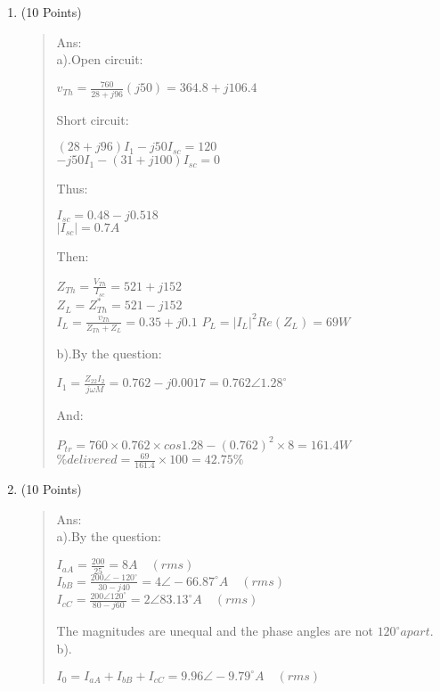 \documentclass[12pt,a4paper]{article}
\begin{document}
\begin{enumerate}
		\clearpage
		\item (10 Points)
		\begin{quote}
			Ans:\\
			a).Open circuit:
			\begin{center}
				$v_{Th}=\frac{760}{28+j96}(j50)=364.8+j106.4$
			\end{center}
			Short circuit:
			\begin{center}
				$(28+j96)I_1-j50I_{sc}=120$\\
				$-j50I_1-(31+j100)I_{sc}=0$
			\end{center}
			Thus:
			\begin{center}
				$I_{sc}=0.48-j0.518$\\
				$|I_{sc}|=0.7A$
			\end{center}
			Then:
			\begin{center}
				$Z_{Th}=\frac{V_{Th}}{I_{sc}}=521+j152$\\
				$Z_L=Z_{Th}^*=521-j152$\\
				$I_L=\frac{v_{Th}}{Z_{Th}+Z_L}=0.35+j0.1$
				$P_L=|I_L|^2Re(Z_L)=69W$
			\end{center}
			b).By the question:
			\begin{center}
				$I_1=\frac{Z_{22}I_2}{j\omega M}=0.762-j0.0017=0.762\angle 1.28^\circ$
			\end{center}
		And:
		\begin{center}
			$P_{tr}=760\times 0.762\times cos1.28 -(0.762)^2\times 8=161.4W$\\
			$\% delivered=\frac{69}{161.4}\times 100= 42.75\%$
		\end{center}
		\end{quote}
	
		\clearpage
		\item (10 Points)
		\begin{quote}
			Ans:\\
			a).By the question:
			\begin{center}
				$I_{aA}=\frac{200}{25}=8A\quad (rms)$\\
				$I_{bB}=\frac{200\angle-120^\circ}{30-j40}=4\angle -66.87^\circ A\quad (rms)$\\
				$I_{cC}=\frac{200\angle120^\circ}{80-j60}=2\angle 83.13^\circ A\quad (rms)$
			\end{center}
			The magnitudes are unequal and the phase angles are not $120^\circ apart.$\\
			b).\begin{center}
				$I_0=I_{aA}+I_{bB}+I_{cC}=9.96\angle-9.79^\circ A\quad (rms)$
			\end{center}
		\end{quote}


	\end{enumerate}
\end{document}
